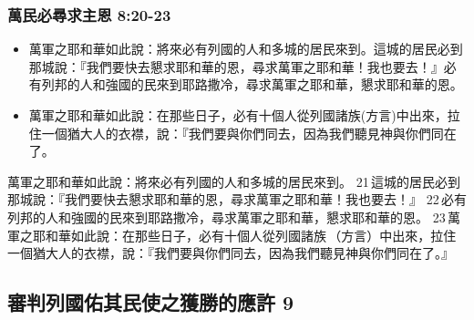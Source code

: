 \subsubsection{萬民必尋求主恩 8:20-23}
\begin{itemize} 
\itemsep-.5em 
\item 萬軍之耶和華如此說：將來必有列國的人和多城的居民來到。這城的居民必到那城說：『我們要快去懇求耶和華的恩，尋求萬軍之耶和華！我也要去！』必有列邦的人和強國的民來到耶路撒冷，尋求萬軍之耶和華，懇求耶和華的恩。
\item 萬軍之耶和華如此說：在那些日子，必有十個人從列國諸族(方言)中出來，拉住一個猶大人的衣襟，說：『我們要與你們同去，因為我們聽見神與你們同在了。
\end{itemize}
萬軍之耶和華如此說：將來必有列國的人和多城的居民來到。 21 這城的居民必到那城說：『我們要快去懇求耶和華的恩，尋求萬軍之耶和華！我也要去！』 22 必有列邦的人和強國的民來到耶路撒冷，尋求萬軍之耶和華，懇求耶和華的恩。 23 萬軍之耶和華如此說：在那些日子，必有十個人從列國諸族 （方言）中出來，拉住一個猶大人的衣襟，說：『我們要與你們同去，因為我們聽見神與你們同在了。』



\subsection{審判列國佑其民使之獲勝的應許 9}
